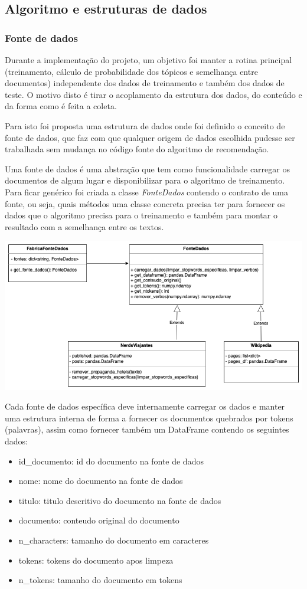 \subsection{Algoritmo e estruturas de dados}

\subsubsection{Fonte de dados}
Durante a implementação do projeto, um objetivo foi manter a rotina principal (treinamento, cálculo de probabilidade dos tópicos e semelhança entre documentos) independente dos dados de treinamento e também dos dados de teste. O motivo disto é tirar o acoplamento da estrutura dos dados, do conteúdo e da forma como é feita a coleta.

Para isto foi proposta uma estrutura de dados onde foi definido o conceito de fonte de dados, que faz com que qualquer origem de dados escolhida pudesse ser trabalhada sem mudança no código fonte do algoritmo de recomendação.

Uma fonte de dados é uma abstração que tem como funcionalidade carregar os documentos de algum lugar e disponibilizar para o algoritmo de treinamento. Para ficar genérico foi criada a classe \textit{FonteDados} contendo o contrato de uma fonte, ou seja, quais métodos uma classe concreta precisa ter para fornecer os dados que o algoritmo precisa para o treinamento e também para montar o resultado com a semelhança entre os textos.

\includegraphics[scale=0.5]{fonte_dados.png}

Cada fonte de dados específica deve internamente carregar os dados e manter uma estrutura interna de forma a fornecer os documentos quebrados por tokens (palavras), assim como fornecer também um DataFrame contendo os seguintes dados:

\begin{itemize}
    \item id\_documento: id do documento na fonte de dados
    \item nome: nome do documento na fonte de dados
    \item titulo: titulo descritivo do documento na fonte de dados
    \item documento: conteudo original do documento
    \item n\_characters: tamanho do documento em caracteres
    \item tokens: tokens do documento apos limpeza
    \item n\_tokens: tamanho do documento em tokens
\end{itemize}


